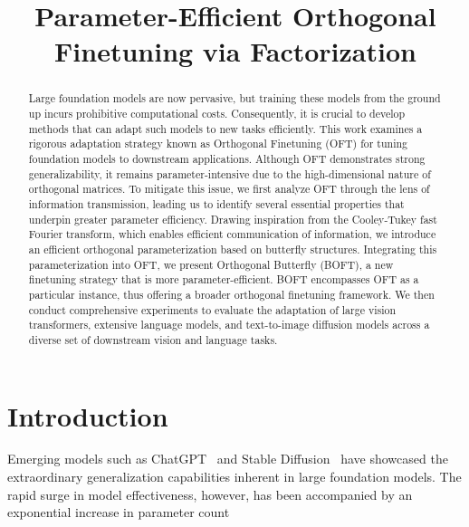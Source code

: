 \title{Parameter-Efficient Orthogonal Finetuning via Factorization}

\begin{abstract}
Large foundation models are now pervasive, but training these models from the ground up incurs prohibitive computational costs. Consequently, it is crucial to develop methods that can adapt such models to new tasks efficiently. This work examines a rigorous adaptation strategy known as Orthogonal Finetuning (OFT) for tuning foundation models to downstream applications. Although OFT demonstrates strong generalizability, it remains parameter-intensive due to the high-dimensional nature of orthogonal matrices. To mitigate this issue, we first analyze OFT through the lens of information transmission, leading us to identify several essential properties that underpin greater parameter efficiency. Drawing inspiration from the Cooley-Tukey fast Fourier transform, which enables efficient communication of information, we introduce an efficient orthogonal parameterization based on butterfly structures. Integrating this parameterization into OFT, we present Orthogonal Butterfly (BOFT), a new finetuning strategy that is more parameter-efficient. BOFT encompasses OFT as a particular instance, thus offering a broader orthogonal finetuning framework. We then conduct comprehensive experiments to evaluate the adaptation of large vision transformers, extensive language models, and text-to-image diffusion models across a diverse set of downstream vision and language tasks.
\end{abstract}

\section{Introduction}

Emerging models such as ChatGPT~\cite{brown2020language,chen2021evaluating} and Stable Diffusion~\cite{rombach2022high} have showcased the extraordinary generalization capabilities inherent in large foundation models. The rapid surge in model effectiveness, however, has been accompanied by an exponential increase in parameter count

